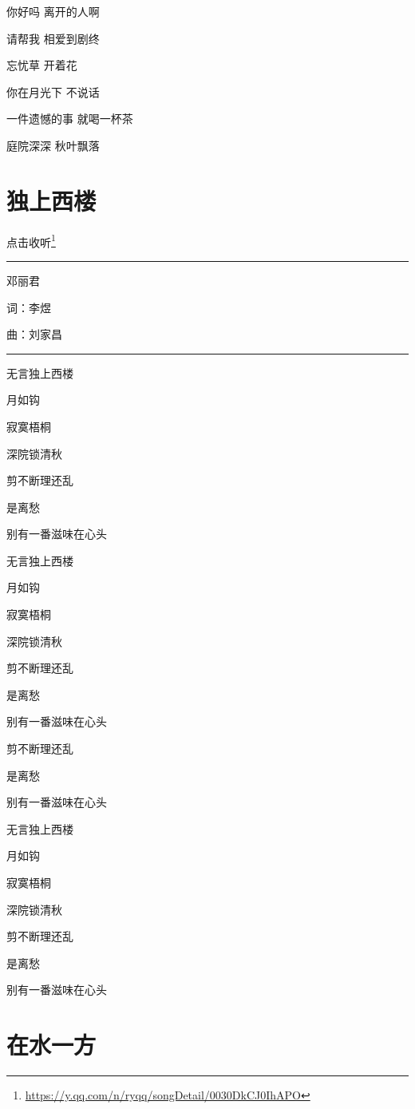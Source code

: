 \documentclass[]{ctexbook}
\renewcommand{\href}[2]{#2\footnote{\url{#1}}}
\begin{document}
你好吗 离开的人啊

请帮我 相爱到剧终

忘忧草 开着花

你在月光下 不说话

一件遗憾的事 就喝一杯茶

庭院深深 秋叶飘落

\section*{独上西楼}\label{one-in-the-building}


\href{https://y.qq.com/n/ryqq/songDetail/0030DkCJ0IhAPO}{点击收听}

\begin{center}\rule{0.5\linewidth}{0.5pt}\end{center}

邓丽君

词：李煜

曲：刘家昌

\begin{center}\rule{0.5\linewidth}{0.5pt}\end{center}

无言独上西楼

月如钩

寂寞梧桐

深院锁清秋

剪不断理还乱

是离愁

别有一番滋味在心头

无言独上西楼

月如钩

寂寞梧桐

深院锁清秋

剪不断理还乱

是离愁

别有一番滋味在心头

剪不断理还乱

是离愁

别有一番滋味在心头

无言独上西楼

月如钩

寂寞梧桐

深院锁清秋

剪不断理还乱

是离愁

别有一番滋味在心头

\section*{在水一方}\label{on-the-water-side}
\end{document}

